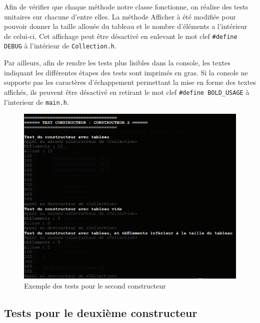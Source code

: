 \documentclass[11pt]{article}
\begin{document}
Afin de vérifier que chaque méthode  notre classe fonctionne, on réalise des tests unitaires sur chacune d'entre elles. La méthode Afficher à été modifiée pour pouvoir donner la taille allouée du tableau et le nombre d'éléments a l'intérieur de celui-ci. Cet affichage peut être désactivé en enlevant le mot clef \texttt{\#define DEBUG} à l'intérieur de \texttt{Collection.h}.

Par ailleurs, afin de rendre les tests plus lisibles dans la console, les textes indiquant les différentes étapes des tests sont imprimés en gras. Si la console ne supporte pas les caractères d'échappement permettant la mise en forme des textes affichés, ils peuvent être désactivé en retirant le mot clef \texttt{\#define~BOLD\_USAGE} à l'interieur de \texttt{main.h}.

\begin{figure}[htp]
\centering
\includegraphics[scale=0.60]{TestConstructeurs.png}
\caption{Exemple des tests pour le second constructeur}
\label{testConstructeur}
\end{figure}

\subsection{Tests pour le deuxième constructeur}
\end{document}
